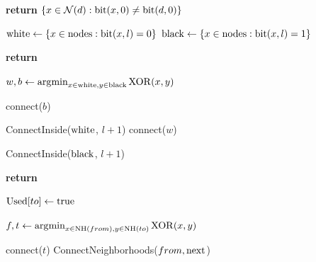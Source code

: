 \documentclass[conference]{IEEEtran}
\theoremstyle{definition}
\DeclareMathOperator*{\argmin}{\arg\!\min}
\newcommand{\cN}{{\mathcal{N}}}
\begin{document}
\begin{algorithm}
    \begin{algorithmic}[1]

           
            \State \textbf{return} $ \{x \in \cN(d): {\rm bit}(x, 0) 
            		\ne {\rm bit}(d, 0)\} $
        \EndFunction

    \end{algorithmic}
\end{algorithm}

\begin{algorithm}
    \begin{algorithmic}[1]

            \State ${\rm white} \gets \{x \in {\rm nodes}: {\rm bit}(x, l) = 0\}$
            \State ${\rm black} \gets \{x \in {\rm nodes}: {\rm bit}(x, l) = 1\}$
            
                \State \textbf{return}
            \EndIf

            \State $w,b \gets \argmin_{x \in {\rm white}, y \in {\rm black}}{\rm XOR}(x, y)$

                    \State connect($b$)
                \EndIf
                
                \State ConnectInside(${\rm white}$, $l + 1$)
            \Else
                    \State connect($w$)
                \EndIf

                \State ConnectInside(${\rm black}$, $l + 1$)
            \EndIf
        \EndProcedure
        
    \end{algorithmic}
\end{algorithm}

\begin{algorithm}
    \begin{algorithmic}[1]
        
                \State \textbf{return}      %
            \EndIf
                
            \State ${\rm Used}[to] \gets {\rm true}$

                \State $f, t \gets \argmin_{x \in {\rm NH}(from), y \in {\rm NH}(to)}{\rm XOR}(x, y)$

                    \State connect($t$)
                \EndIf
            \Else
                \For {${\rm next} \in \cN(to) \setminus {\rm NH}(to)$}
                    \State ConnectNeighborhoods($from, {\rm next}$)
                \EndFor
            \EndIf

        \EndProcedure
    \end{algorithmic}
\end{algorithm}
\end{document}
